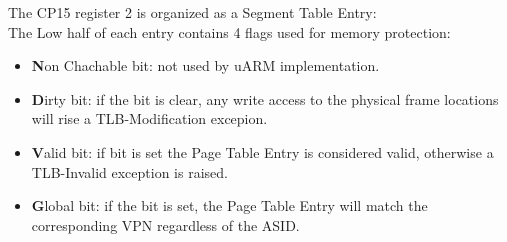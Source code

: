 The CP15 register 2 is organized as a Segment Table Entry:
\\



The Low half of each entry contains 4 flags used for memory protection:
\begin{itemize}
\item \textbf{N}on Chachable bit: not used by uARM implementation.
\item \textbf{D}irty bit: if the bit is clear, any write access to the physical frame locations will rise a TLB-Modification excepion.
\item \textbf{V}alid bit: if bit is set the Page Table Entry is considered valid, otherwise a TLB-Invalid exception is raised.
\item \textbf{G}lobal bit: if the bit is set, the Page Table Entry will match the corresponding VPN regardless of the ASID.
\end{itemize}
